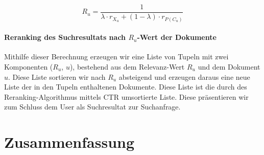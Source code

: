 \vspace{-1.5em}
\begin{equation}
	R_{u} = \frac{1}{\lambda\cdot r_{X_{u}} + (1 - \lambda)\cdot r_{P(C_{u})}}
\end{equation}
\vspace{-1em}

\paragraph{Reranking des Suchresultats nach $R_{u}$-Wert der Dokumente}
Mithilfe dieser Berechnung erzeugen wir eine Liste von Tupeln mit zwei Komponenten ($R_{u}$, $u$), bestehend aus dem Relevanz-Wert $R_{u}$ und dem Dokument $u$. Diese Liste sortieren wir nach $R_{u}$ absteigend und erzeugen daraus eine neue Liste der in den Tupeln enthaltenen Dokumente. Diese Liste ist die durch des Reranking-Algorithmus mittels CTR umsortierte Liste. Diese präsentieren wir zum Schluss dem User als Suchresultat zur Suchanfrage. 


\section{Zusammenfassung}
\label{sec:Reranking:Zusammenfassung}

